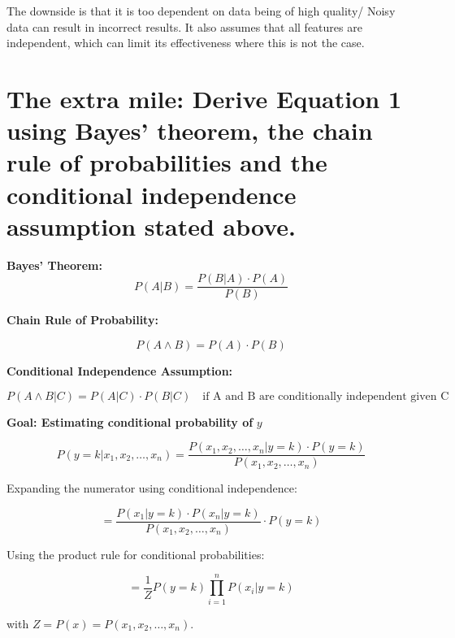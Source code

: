 \documentclass{article}
\begin{document}
The downside is that it is too dependent on data being of high quality/ Noisy data can result in incorrect results. It also assumes that all features are independent, which can limit its effectiveness where this is not the case. 

\section{The extra mile: Derive Equation 1 using Bayes’ theorem, the chain rule of probabilities and the conditional independence assumption stated above.}

\textbf{Bayes' Theorem:}
\[
P(A|B) = \frac{P(B|A) \cdot P(A)}{P(B)}
\]

\textbf{Chain Rule of Probability:}

\[
P(A \land B) = P(A) \cdot P(B)
\]

\textbf{Conditional Independence Assumption:}

\[
P(A \land B | C) = P(A|C) \cdot P(B|C) \quad \text{if A and B are conditionally independent given C}
\]

\textbf{Goal: Estimating conditional probability of } \( y \)

\[
P(y = k | x_1, x_2, \dots, x_n) = \frac{P(x_1, x_2, \dots, x_n | y = k) \cdot P(y = k)}{P(x_1, x_2, \dots, x_n)}
\]

Expanding the numerator using conditional independence:

\[
= \frac{P(x_1 | y = k) \cdot P(x_n | y = k)}{P(x_1, x_2, \dots, x_n)} \cdot P(y = k)
\]

Using the product rule for conditional probabilities:

\[
= \frac{1}{Z} P(y = k) \prod_{i=1}^n P(x_i | y = k) 
\]

with \( Z = P(x) = P(x_1, x_2, \dots, x_n) \).
\end{document}
